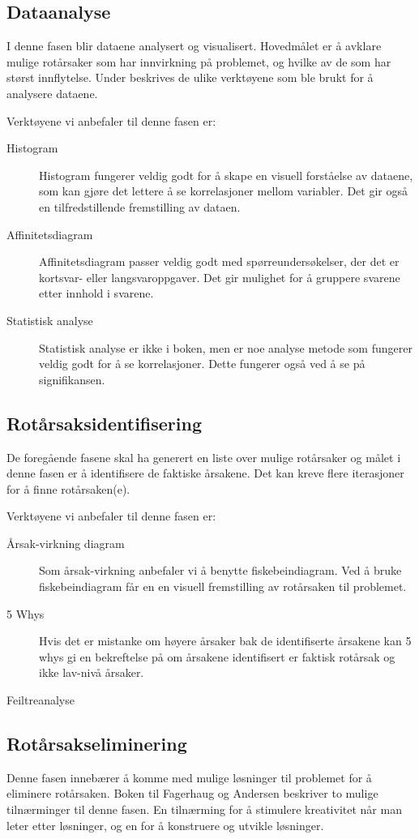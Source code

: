 \subsection{Dataanalyse}
I denne fasen blir dataene analysert og visualisert. Hovedmålet er å avklare mulige rotårsaker som har innvirkning på problemet, og hvilke av de som har størst innflytelse. Under beskrives de ulike verktøyene som ble brukt for å analysere dataene.

Verktøyene vi anbefaler til denne fasen er:
\begin{description}
    \item[Histogram] Histogram fungerer veldig godt for å skape en visuell forståelse av dataene, som kan gjøre det lettere å se korrelasjoner mellom variabler. Det gir også en tilfredstillende fremstilling av dataen. 
    \item[Affinitetsdiagram] Affinitetsdiagram passer veldig godt med spørreundersøkelser, der det er kortsvar- eller langsvaroppgaver. Det gir mulighet for å gruppere svarene etter innhold i svarene. 
    \item[Statistisk analyse] Statistisk analyse er ikke i boken, men er noe analyse metode som fungerer veldig godt for å se korrelasjoner. Dette fungerer også ved å se på signifikansen.
\end{description}

\subsection{Rotårsaksidentifisering}
De foregående fasene skal ha generert en liste over mulige rotårsaker og målet i denne fasen er å identifisere de faktiske årsakene. Det kan kreve flere iterasjoner for å finne rotårsaken(e). 

Verktøyene vi anbefaler til denne fasen er:
\begin{description}
    \item[Årsak-virkning diagram] Som årsak-virkning anbefaler vi å benytte fiskebeindiagram. Ved å bruke fiskebeindiagram får en en visuell fremstilling av rotårsaken til problemet. 
    \item[5 Whys] Hvis det er mistanke om høyere årsaker bak de identifiserte årsakene kan 5 whys gi en bekreftelse på om årsakene identifisert er faktisk rotårsak og ikke lav-nivå årsaker. 
    \item[Feiltreanalyse] 
\end{description}

\subsection{Rotårsakseliminering}
Denne fasen innebærer å komme med mulige løsninger til problemet for å eliminere rotårsaken. Boken til Fagerhaug og Andersen \cite{RCA} beskriver to mulige tilnærminger til denne fasen. En tilnærming for å stimulere kreativitet når man leter etter løsninger, og en for å konstruere og utvikle løsninger.

